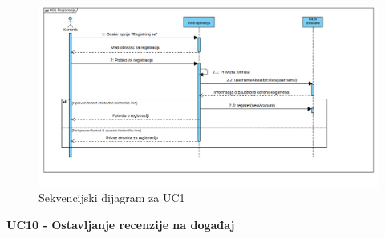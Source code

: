 				\newpage

        \begin{figure}[htbp]
          \centering
          \includegraphics[width=1\textwidth]{dijagrami/UC1-Registracija_novi.png}
          \caption{Sekvencijski dijagram za UC1}
        \label{fig:my_image}
        \end{figure}

		\newpage
				\noindent \textbf{UC10 - Ostavljanje recenzije na događaj}

